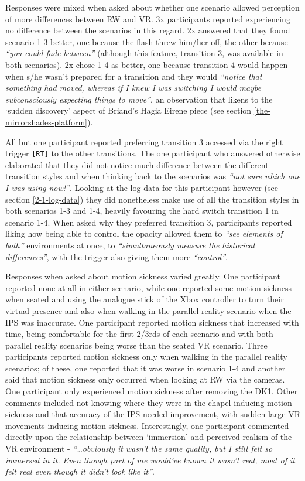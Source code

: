 Responses were mixed when asked about whether one scenario allowed perception of more differences between RW and VR. 3x participants reported experiencing no difference between the scenarios in this regard. 2x answered that they found scenario 1-3 better, one because the flash threw him/her off, the other because \textit{``you could fade between''}  (although this feature, transition 3, was available in both scenarios). 2x chose 1-4 as better, one because transition 4 would happen when s/he wasn't prepared for a transition and they would \textit{``notice that something had moved, whereas if I knew I was switching I would maybe subconsciously expecting things to move''}, an observation that likens to the `sudden discovery' aspect of Briand's Hagia Eirene piece (see section \ref{the-mirrorshades-platform}).

All but one participant reported preferring transition 3 accessed via the right trigger \texttt{[RT]} to the other transitions. The one participant who answered otherwise elaborated that they did not notice much difference between the different transition styles and when thinking back to the scenarios was \textit{``not sure which one I was using now!''}. Looking at the log data for this participant however (see section \ref{2-1-log-data}) they did nonetheless make use of all the transition styles in both scenarios 1-3 and 1-4, heavily favouring the hard switch transition 1 in scenario 1-4. When asked why they preferred transition 3, participants reported liking how being able to control the opacity allowed them to \textit{``see elements of both''} environments at once, to \textit{``simultaneously measure the historical differences''}, with the trigger also giving them more \textit{``control''}.

Responses when asked about motion sickness varied greatly. One participant reported none at all in either scenario, while one reported some motion sickness when seated and using the analogue stick of the Xbox controller to turn their virtual presence and also when walking in the parallel reality scenario when the IPS was inaccurate. One participant reported motion sickness that increased with time, being comfortable for the first 2/3rds of each scenario and with both parallel reality scenarios being worse than the seated VR scenario. Three participants reported motion sickness only when walking in the parallel reality scenarios; of these, one reported that it was worse in scenario 1-4 and another said that motion sickness only occurred when looking at RW via the cameras. One participant only experienced motion sickness after removing the DK1. Other comments included not knowing where they were in the chapel inducing motion sickness and that accuracy of the IPS needed improvement, with sudden large VR movements inducing motion sickness. Interestingly, one participant commented directly upon the relationship between `immersion' and perceived realism of the VR environment - \textit{``\ldots obviously it wasn't the same quality, but I still felt so immersed in it. Even though part of me would've known it wasn't real, most of it felt real even though it didn't look like it''}.

